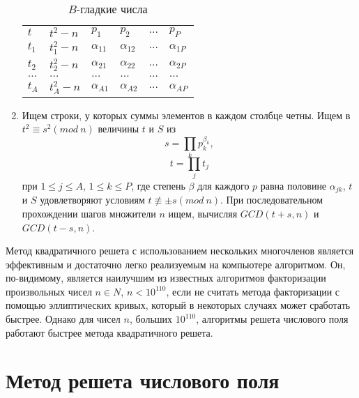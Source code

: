 \begin{enumerate}
        \begin{table}[h]
        \centering
          \begin{tabular}{llllll}
            $t$       & $t^2-n$       & $p_1$          & $p_2$          & $\dots$  & $p_P$  \\
            $t_1$     & $t^{2}_1-n$   & $\alpha_{11}$  & $\alpha_{12}$  & $\dots$  & $\alpha_{1P}$  \\
            $t_2$     & $t^{2}_2-n$   & $\alpha_{21}$  & $\alpha_{22}$  & $\dots$  & $\alpha_{2P}$  \\
            $\dots$   & $\dots$       & $\dots$        & $\dots$        & $\dots$  & $\dots$  \\
            $t_A$     & $t^{2}_A-n$   & $\alpha_{A1}$  & $\alpha_{A2}$  & $\dots$  & $\alpha_{AP}$ 
          \end{tabular}
          \caption{$B$-гладкие числа}
          \label{table-quadric-sieve}
        \end{table}

    \item Ищем строки, у которых суммы элементов в каждом столбце четны. Ищем в $t^2 \equiv s^2 (mod \: n)$ величины $t$ и $S$ 
      из 
        \begin{equation}
          s=\prod_{k}{p^{\beta_k}_k}, 
        \end{equation}
        \begin{equation}
          t=\prod_{j}{t_j}
        \end{equation}
      при $1 \le j \le A$, $1 \le k \le P$, где степень $\beta$ для каждого $p$ равна 
      половине $\alpha_{jk}$, $t$ и $S$ удовлетворяют условиям $t \not\equiv \pm s(mod \: n)$. При последовательном прохождении шагов множители $n$ 
      ищем, вычисляя $GCD(t + s, n)$ и $GCD(t - s, n)$.
  \end{enumerate}

  Метод квадратичного решета с использованием нескольких многочленов является эффективным и достаточно легко реализуемым на компьютере алгоритмом. Он, 
по-видимому, является наилучшим из известных алгоритмов факторизации произвольных чисел $n \in N$, $n < 10^{110}$, если не считать метода факторизации с помощью эллиптических кривых, который в некоторых случаях может сработать быстрее. Однако для чисел $n$, больших $10^{110}$, алгоритмы
решета числового поля работают быстрее метода квадратичного решета.


\section{Метод решета числового поля}

